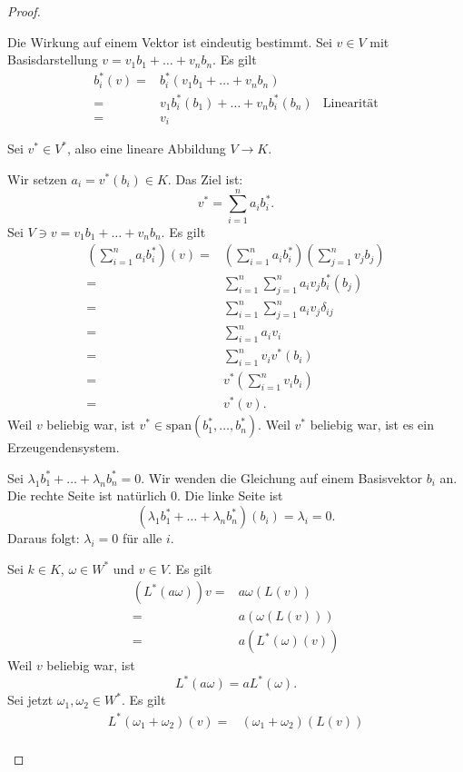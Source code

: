 \begin{proof}
	\begin{parts}
	\item Die Wirkung auf einem Vektor ist eindeutig bestimmt. Sei $v\in V$ mit Basisdarstellung $v=v_1b_1+\dots+v_n b_n$. Es gilt
		\begin{align*}
			b_i^*(v)=&b_i^*(v_1b_1+\dots+v_nb_n)\\
			=&v_1b_i^*(b_1)+\dots+v_nb_i^*(b_n) & \text{Linearität}\\
			=&v_i
		\end{align*}
	\item Sei $v^*\in V^*$, also eine lineare Abbildung $V\to K$. 

	Wir setzen $a_i=v^*(b_i)\in K$. Das Ziel ist:
	\[
		v^*=\sum_{i=1}^n a_i b_i^*
	.\] 
	Sei $V\ni v = v_1b_1+\dots+v_nb_n$. Es gilt
	\begin{align*}
		\left(\sum_{i=1}^na_i b_i^*\right)(v)=&\left( \sum_{i=1}^n a_i b_i^* \right)\left( \sum_{j=1}^n v_j b_j \right) \\
	=&\sum_{i=1}^n \sum_{j=1}^{n} a_i v_j b_i^*(b_j)\\
	=&\sum_{i=1}^n\sum_{j=1}^n a_iv_j\delta_{ij}\\
	=&\sum_{i=1}^n a_i v_i\\
	=&\sum_{i=1}^n v_i v^*(b_i)\\
	=&v^*\left( \sum_{i=1}^n v_i b_i \right) \\
	=&v^*(v).
	\end{align*}
	Weil $v$ beliebig war, ist $v^*\in\text{span}(b_1^*,\dots, b_n^*)$. Weil $v^*$ beliebig war, ist es ein Erzeugendensystem.
\item Sei $\lambda_1b_1^*+\dots+\lambda_n b_n^*=0$. Wir wenden die Gleichung auf einem Basisvektor $b_i$ an. Die rechte Seite ist natürlich $0$. Die linke Seite ist
	\[
		(\lambda_1 b_1^*+\dots+\lambda_n b_n^*)(b_i)=\lambda_i=0
	.\] 
	Daraus folgt: $\lambda_i=0$ f\"{u}r alle $i$. 
\item Sei $k\in K$, $\omega \in W^*$ und $v\in V$. Es gilt
	\begin{align*}
		(L^*(a\omega))v=&a\omega(L(v))\\
		=&a(\omega(L(v)))\\
		=&a(L^*(\omega)(v))
	\end{align*}
	Weil $v$ beliebig war, ist
	\[
	L^*(a\omega)=aL^*(\omega)
	.\] 
	Sei jetzt $\omega_1,\omega_2\in W^*$. Es gilt
	\begin{align*}
		L^*(\omega_1+\omega_2)(v)=&(\omega_1+\omega_2)(L(v))\\

\end{align*}
\end{parts}
\end{proof}
